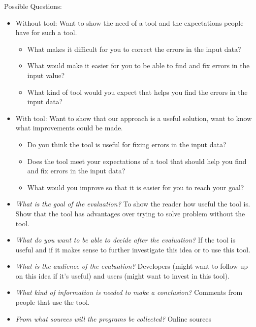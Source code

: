 \documentclass[11pt]{article}
\begin{document}
Possible Questions:
\begin{itemize}
    \item Without tool: Want to show the need of a tool and the expectations people have for such a tool.
    \begin{itemize}
        \item What makes it difficult for you to correct the errors in the input data?
        \item What would make it easier for you to be able to find and fix errors in the input value?
        \item What kind of tool would you expect that helps you find the errors in the input data?
    \end{itemize}
    \item With tool: Want to show that our approach is a useful solution, want to know what improvements could be made.
    \begin{itemize}
        \item Do you think the tool is useful for fixing errors in the input data?
        \item Does the tool meet your expectations of a tool that should help you find and fix errors in the input data?
        \item What would you improve so that it is easier for you to reach your goal?
    \end{itemize}
\end{itemize}

\begin{itemize}
  \item \textit{What is the goal of the evaluation?} To show the reader how useful the tool is. Show that the tool has advantages over trying to solve problem without the tool.
  \item \textit{What do you want to be able to decide after the evaluation?} If the tool is useful and if it makes sense to further investigate this idea or to use this tool.
  \item \textit{What is the audience of the evaluation?} Developers (might want to follow up on this idea if it's useful) and users (might want to invest in this tool).
  \item \textit{What kind of information is needed to make a conclusion?} Comments from people that use the tool.
  \item \textit{From what sources will the programs be collected?} Online sources
\end{itemize}
\end{document}
